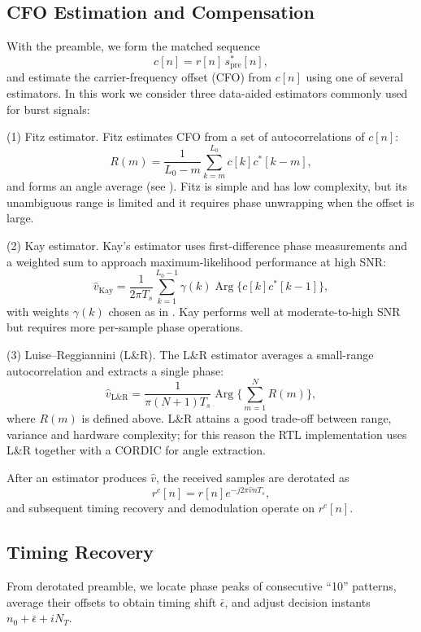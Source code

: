 \documentclass[conference]{IEEEtran}
\DeclareMathOperator{\Arg}{Arg}
\begin{document}
\subsection{CFO Estimation and Compensation}
With the preamble, we form the matched sequence
\begin{equation}
c[n]=r[n]\,s_{\text{pre}}^{*}[n],
\end{equation}
and estimate the carrier-frequency offset (CFO) from $c[n]$ using one of several estimators. In this work we consider three data-aided estimators commonly used for burst signals:

(1) Fitz estimator. Fitz estimates CFO from a set of autocorrelations of $c[n]$:
\begin{equation}
R(m)=\frac{1}{L_0-m}\sum_{k=m}^{L_0}c[k]c^{*}[k-m],
\end{equation}
and forms an angle average (see \cite{Mengali2013}). Fitz is simple and has low complexity, but its unambiguous range is limited and it requires phase unwrapping when the offset is large.

(2) Kay estimator. Kay's estimator uses first-difference phase measurements and a weighted sum to approach maximum-likelihood performance at high SNR:
\begin{equation}
\hat{v}_{\text{Kay}}=\frac{1}{2\pi T_s}\sum_{k=1}^{L_0-1}\gamma(k)\Arg\{c[k]c^*[k-1]\},
\end{equation}
with weights $\gamma(k)$ chosen as in \cite{Mengali2013}. Kay performs well at moderate-to-high SNR but requires more per-sample phase operations.

(3) Luise--Reggiannini (L\&R). The L\&R estimator averages a small-range autocorrelation and extracts a single phase:
\begin{equation}
\hat{v}_{\text{L\&R}}=\frac{1}{\pi (N+1)T_s}\Arg\Big\{\sum_{m=1}^N R(m)\Big\},
\end{equation}
where $R(m)$ is defined above. L\&R attains a good trade-off between range, variance and hardware complexity; for this reason the RTL implementation uses L\&R together with a CORDIC for angle extraction.

After an estimator produces $\hat v$, the received samples are derotated as
\begin{equation}
r^{c}[n]=r[n]e^{-j2\pi \hat{v} n T_s},
\end{equation}
and subsequent timing recovery and demodulation operate on $r^{c}[n]$.

\subsection{Timing Recovery}
From derotated preamble, we locate phase peaks of consecutive ``10'' patterns, average their offsets to obtain timing shift $\bar{\epsilon}$, and adjust decision instants $n_0+\bar{\epsilon}+iN_T$.
\end{document}
